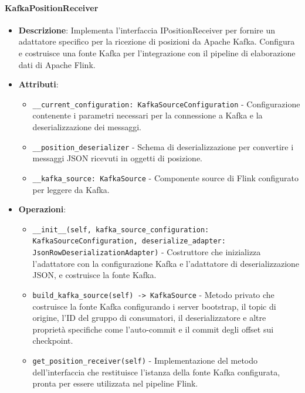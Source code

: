 \documentclass[10pt]{article}
\begin{document}
    \paragraph{KafkaPositionReceiver}
    \begin{itemize} 
    \item \textbf{Descrizione}: Implementa l'interfaccia IPositionReceiver per fornire un adattatore specifico per la ricezione di posizioni da Apache Kafka. Configura e costruisce una fonte Kafka per l'integrazione con il pipeline di elaborazione dati di Apache Flink.
    \item \textbf{Attributi}:
    \begin{itemize}
        \item \texttt{\_\_current\_configuration: KafkaSourceConfiguration} - Configurazione contenente i parametri necessari per la connessione a Kafka e la deserializzazione dei messaggi.
        \item \texttt{\_\_position\_deserializer} - Schema di deserializzazione per convertire i messaggi JSON ricevuti in oggetti di posizione.
        \item \texttt{\_\_kafka\_source: KafkaSource} - Componente source di Flink configurato per leggere da Kafka.
    \end{itemize}
    
    \item \textbf{Operazioni}:
    \begin{itemize}
        \item \texttt{\_\_init\_\_(self, kafka\_source\_configuration: KafkaSourceConfiguration, deserialize\_adapter: JsonRowDeserializationAdapter)} - Costruttore che inizializza l'adattatore con la configurazione Kafka e l'adattatore di deserializzazione JSON, e costruisce la fonte Kafka.
        
        \item \texttt{build\_kafka\_source(self) -> KafkaSource} - Metodo privato che costruisce la fonte Kafka configurando i server bootstrap, il topic di origine, l'ID del gruppo di consumatori, il deserializzatore e altre proprietà specifiche come l'auto-commit e il commit degli offset sui checkpoint.
        
        \item \texttt{get\_position\_receiver(self)} - Implementazione del metodo dell'interfaccia che restituisce l'istanza della fonte Kafka configurata, pronta per essere utilizzata nel pipeline Flink.
    \end{itemize}
    \end{itemize}
\end{document}

